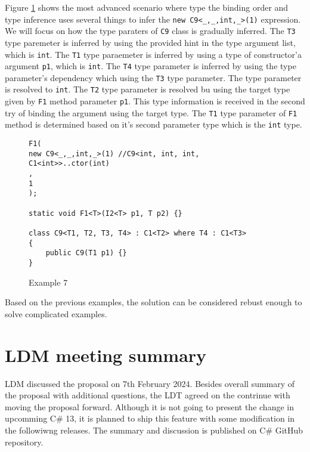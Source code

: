 Figure \ref{img79:example7} shows the most advanced scenario where type the binding order and type inference uses several things to infer the \texttt{new C9<\_,\_,int,\_>(1)} expression.
We will focus on how the type paraters of \texttt{C9} class is gradually inferred.
The \texttt{T3} type paremeter is inferred by using the provided hint in the type argument list, which is \texttt{int}.
The \texttt{T1} type paraemeter is inferred by using a type of constructor'a argument \texttt{p1}, which is \texttt{int}.
The \texttt{T4} type parameter is inferred by using the type parameter's dependency which using the \texttt{T3} type parameter.
The type parameter is resolved to \texttt{int}.
The \texttt{T2} type parameter is resolved bu using the target type given by \texttt{F1} method parameter \texttt{p1}.
This type information is received in the second try of binding the argument using the target type.
The \texttt{T1} type parameter of \texttt{F1} method is determined based on it's second parameter type which is the \texttt{int} type.
\begin{figure}[h]
\begin{lstlisting}[style=csharp, showstringspaces=false]
F1(
new C9<_,_,int,_>(1) //C9<int, int, int, C1<int>>..ctor(int)
,
1
);

static void F1<T>(I2<T> p1, T p2) {}

class C9<T1, T2, T3, T4> : C1<T2> where T4 : C1<T3>
{
    public C9(T1 p1) {}
}
\end{lstlisting}
\caption{Example 7}
\label{img79:example7}
\end{figure}
\par
Based on the previous examples, the solution can be considered rebust enough to solve complicated examples.

\section{LDM meeting summary}

\ac{LDM} discussed the proposal on 7th February 2024.
Besides overall summary of the proposal with additional questions, the \ac{LDT} agreed on the contrinue with moving the proposal forward.
Although it is not going to present the change in upcomming C\# 13, it is planned to ship this feature with some modification in the followiwng releases.
The summary \cite{online:mettingSummary} and discussion \cite{online:mettingSummaryDisc} is published on C\# GitHub repository.
